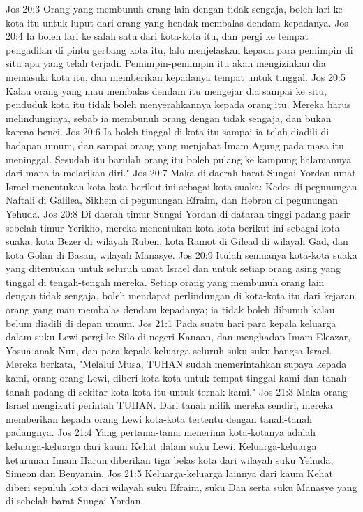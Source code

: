 Jos 20:3  Orang yang membunuh orang lain dengan tidak sengaja, boleh lari ke kota itu untuk luput dari orang yang hendak membalas dendam kepadanya.
Jos 20:4  Ia boleh lari ke salah satu dari kota-kota itu, dan pergi ke tempat pengadilan di pintu gerbang kota itu, lalu menjelaskan kepada para pemimpin di situ apa yang telah terjadi. Pemimpin-pemimpin itu akan mengizinkan dia memasuki kota itu, dan memberikan kepadanya tempat untuk tinggal.
Jos 20:5  Kalau orang yang mau membalas dendam itu mengejar dia sampai ke situ, penduduk kota itu tidak boleh menyerahkannya kepada orang itu. Mereka harus melindunginya, sebab ia membunuh orang dengan tidak sengaja, dan bukan karena benci.
Jos 20:6  Ia boleh tinggal di kota itu sampai ia telah diadili di hadapan umum, dan sampai orang yang menjabat Imam Agung pada masa itu meninggal. Sesudah itu barulah orang itu boleh pulang ke kampung halamannya dari mana ia melarikan diri."
Jos 20:7  Maka di daerah barat Sungai Yordan umat Israel menentukan kota-kota berikut ini sebagai kota suaka: Kedes di pegunungan Naftali di Galilea, Sikhem di pegunungan Efraim, dan Hebron di pegunungan Yehuda.
Jos 20:8  Di daerah timur Sungai Yordan di dataran tinggi padang pasir sebelah timur Yerikho, mereka menentukan kota-kota berikut ini sebagai kota suaka: kota Bezer di wilayah Ruben, kota Ramot di Gilead di wilayah Gad, dan kota Golan di Basan, wilayah Manasye.
Jos 20:9  Itulah semuanya kota-kota suaka yang ditentukan untuk seluruh umat Israel dan untuk setiap orang asing yang tinggal di tengah-tengah mereka. Setiap orang yang membunuh orang lain dengan tidak sengaja, boleh mendapat perlindungan di kota-kota itu dari kejaran orang yang mau membalas dendam kepadanya; ia tidak boleh dibunuh kalau belum diadili di depan umum.
Jos 21:1  Pada suatu hari para kepala keluarga dalam suku Lewi pergi ke Silo di negeri Kanaan, dan menghadap Imam Eleazar, Yosua anak Nun, dan para kepala keluarga seluruh suku-suku bangsa Israel. Mereka berkata, "Melalui Musa, TUHAN sudah memerintahkan supaya kepada kami, orang-orang Lewi, diberi kota-kota untuk tempat tinggal kami dan tanah-tanah padang di sekitar kota-kota itu untuk ternak kami."
Jos 21:3  Maka orang Israel mengikuti perintah TUHAN. Dari tanah milik mereka sendiri, mereka memberikan kepada orang Lewi kota-kota tertentu dengan tanah-tanah padangnya.
Jos 21:4  Yang pertama-tama menerima kota-kotanya adalah keluarga-keluarga dari kaum Kehat dalam suku Lewi. Keluarga-keluarga keturunan Imam Harun diberikan tiga belas kota dari wilayah suku Yehuda, Simeon dan Benyamin.
Jos 21:5  Keluarga-keluarga lainnya dari kaum Kehat diberi sepuluh kota dari wilayah suku Efraim, suku Dan serta suku Manasye yang di sebelah barat Sungai Yordan.
